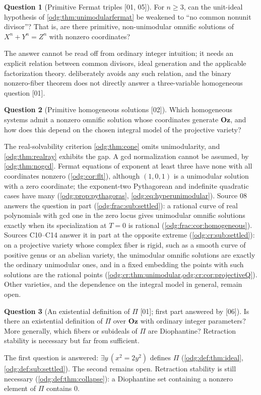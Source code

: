 \documentclass[11pt,oneside]{article}
\numberwithin{equation}{section}
\theoremstyle{definition}
\newtheorem{question}[question]{Question}
\theoremstyle{remark}
\newcommand{\Oz}{\mathbf{Oz}}
\newcommand{\src}[1]{\textup{\textsf{\small[#1]}}}
\begin{document}
\begin{question}[Primitive Fermat triples \src{01, 05}]\label{odg:q:primitivefermat}
For $n\ge3$, can the unit-ideal hypothesis of
\cref{odg:thm:unimodularfermat} be weakened to ``no common nonunit
divisor''? That is, are there primitive, non-unimodular omnific solutions of
$X^n+Y^n=Z^n$ with nonzero coordinates?
\end{question}
The answer cannot be read off from ordinary integer intuition; it needs an
explicit relation between common divisors, ideal generation and the
applicable factorization theory.  deliberately
avoids any such relation, and the binary nonzero-fiber theorem does not
directly answer a three-variable homogeneous question \src{01}.

\begin{question}[Primitive homogeneous solutions \src{02}]\label{odg:q:homogeneous}
Which homogeneous systems admit a nonzero omnific solution whose coordinates
generate $\Oz$, and how does this depend on the chosen integral model of the
projective variety?
\end{question}
The real-solvability criterion \cref{odg:thm:cone} omits unimodularity, and
\cref{odg:thm:realray} exhibits the gap. A gcd normalization cannot be
assumed, by \cref{odg:thm:nogcd}. Fermat equations of exponent at least
three have none with all coordinates nonzero (\cref{odg:cor:flt}), although
$(1,0,1)$ is a unimodular solution with a zero coordinate; the exponent-two Pythagorean and
indefinite quadratic cases have many (\cref{odg:prop:pythagoras},
\eqref{odg:eq:hyperunimodular}). Source 08 answers the question in part
(\cref{odg:frac:sub:settled}): a rational curve of real polynomials with gcd one
in the zero locus gives unimodular omnific solutions exactly when its
specialization at $T=0$ is rational (\cref{odg:frac:cor:homogeneous}). Sources
C10--C14 answer it in part at the opposite extreme (\cref{odg:cr:sub:settled}): on a
projective variety whose complex fiber is rigid, such as a smooth curve of positive
genus or an abelian variety, the unimodular omnific solutions are exactly the
ordinary unimodular ones, and in a fixed embedding the points with such solutions are
the rational points (\cref{odg:cr:thm:unimodular,odg:cr:cor:projectiveQ}). Other
varieties, and the dependence on the integral model in general, remain open.

\begin{question}[An existential definition of $\Pi$ \src{01}; first part answered by \src{06}]\label{odg:q:existentialPi}
Is there an existential definition of $\Pi$ over $\Oz$ with ordinary integer
parameters? More generally, which fibers or subideals of $\Pi$ are
Diophantine? Retraction stability is necessary but far from sufficient.
\end{question}
The first question is answered: $\exists y\,(x^2=2y^2)$ defines $\Pi$
(\cref{odg:def:thm:ideal}, \cref{odg:def:sub:settled}). The second remains
open. Retraction stability is still necessary
(\cref{odg:def:thm:collapse}): a Diophantine set containing a nonzero element
of $\Pi$ contains $0$.
\end{document}
